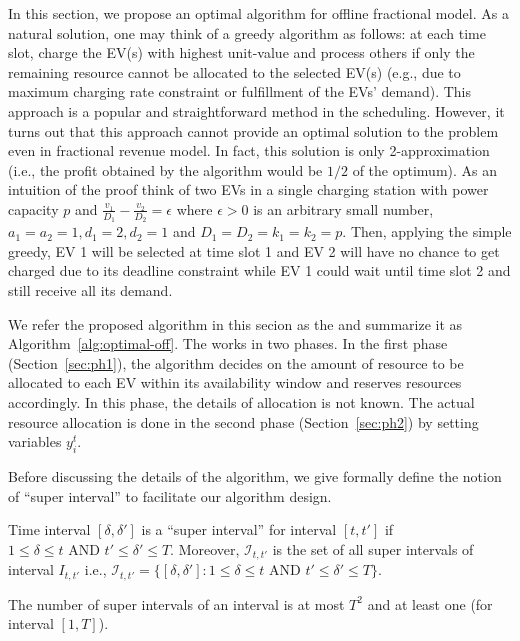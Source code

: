 In this section, we propose an optimal algorithm for offline fractional model. As a natural solution, one may think of a greedy algorithm as follows: at each time slot, charge the EV(s) with highest unit-value and process others if only the remaining resource cannot be allocated to the selected EV(s) (e.g., due to maximum charging rate constraint or fulfillment of the EVs' demand). 
This approach is a popular and straightforward method in the scheduling. However, it turns out that this approach cannot provide an optimal solution to the problem even in fractional revenue model. In fact, this solution is only 2-approximation (i.e., the profit obtained by the algorithm would be $1/2$ of the optimum). As an intuition of the proof think of two EVs in a single charging station with power capacity $p$ and $\frac{v_1}{D_1}-\frac{v_2}{D_2}=\epsilon$  where $\epsilon > 0$ is an arbitrary small number, $a_1=a_2=1, d_1=2, d_2=1$ and $D_1=D_2=k_1=k_2=p$. Then, applying the simple greedy, EV 1 will be selected at time slot 1 and EV 2 will have no chance to get charged due to its deadline constraint while EV 1 could wait until time slot 2 and still receive all its demand.
	
We refer the proposed algorithm in this secion as the \fcs and summarize it as Algorithm~\ref{alg:optimal-off}.
The \fcs works in two phases. In the first phase (Section~\ref{sec:ph1}), the algorithm decides on the amount of resource to be allocated to each EV within its availability window and reserves resources accordingly. In this phase, the details of allocation is not known. The actual resource allocation is done in the second phase (Section~\ref{sec:ph2}) by setting variables $y_i^t$.

Before discussing the details of the algorithm, we give formally define the notion of ``super interval'' to facilitate our algorithm design.

\begin{defi}
	Time interval $[\delta,\delta']$ is a ``super interval'' for interval $[t,t']$ if $1\leq \delta\leq t \text{~AND~} t' \leq \delta'\leq T$.
	Moreover, $\mathcal{I}_{t,t'}$ is the set of all super intervals of interval $I_{t,t'}$ i.e., ${\mathcal{I}_{t,t'}=\{[\delta,\delta']: 1\leq \delta\leq t \text{~AND~} t'\leq \delta'\leq T\}}$.
\end{defi}

The number of super intervals of an interval is at most $T^2$ and at least one (for interval $[1,T]$). 

